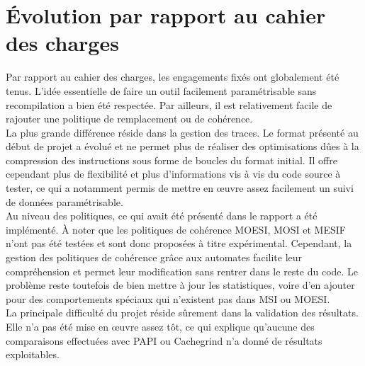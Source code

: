 \section{\'Evolution par rapport au cahier des charges}

Par rapport au cahier des charges, les engagements fixés ont globalement été tenus. L'idée essentielle de faire un outil facilement paramétrisable sans recompilation a bien été respectée. Par ailleurs, il est relativement facile de rajouter une politique de remplacement ou de cohérence. \\

La plus grande différence réside dans la gestion des traces. Le format présenté au début de projet a évolué et ne permet plus de réaliser des optimisations dûes à la compression des instructions sous forme de boucles du format initial. Il offre cependant plus de flexibilité et plus d'informations vis à vis du code source à tester, ce qui a notamment permis de mettre en {\oe}uvre assez facilement un suivi de données paramétrisable. \\

Au niveau des politiques, ce qui avait été présenté dans le rapport a été implémenté. \`A noter que les politiques de cohérence MOESI, MOSI et MESIF n'ont pas été testées et sont donc proposées à titre expérimental. Cependant, la gestion des politiques de cohérence grâce aux automates facilite leur compréhension et permet leur modification sans rentrer dans le reste du code. Le problème reste toutefois de bien mettre à jour les statistiques, voire d'en ajouter pour des comportements spéciaux qui n'existent pas dans MSI ou MOESI. \\

La principale difficulté du projet réside sûrement dans la validation des résultats. Elle n'a pas été mise en \oe uvre assez tôt, ce qui explique qu'aucune des comparaisons effectuées avec \textsf{PAPI} ou \textsf{Cachegrind} n'a donné de résultats exploitables.
